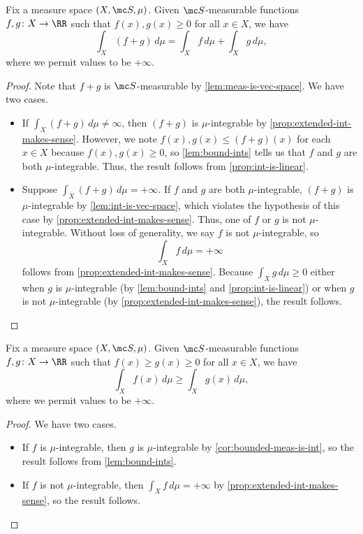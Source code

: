 \documentclass[../notes.tex]{subfiles}
\begin{document}
\begin{lemma} \label{lem:add-extended-int}
	Fix a measure space $(X,\mc S,\mu)$. Given $\mc S$-measurable functions $f,g\colon X\to\RR$ such that $f(x),g(x)\ge0$ for all $x\in X$, we have
	\[\int_X(f+g)\,d\mu=\int_Xf\,d\mu+\int_Xg\,d\mu,\]
	where we permit values to be $+\infty$.
\end{lemma}
\begin{proof}
	Note that $f+g$ is $\mc S$-measurable by \autoref{lem:meas-is-vec-space}. We have two cases.
	\begin{itemize}
		\item If $\int_X(f+g)\,d\mu\ne\infty$, then $(f+g)$ is $\mu$-integrable by \autoref{prop:extended-int-makes-sense}. However, we note $f(x),g(x)\le(f+g)(x)$ for each $x\in X$ because $f(x),g(x)\ge0$, so \autoref{lem:bound-ints} tells us that $f$ and $g$ are both $\mu$-integrable. Thus, the result follows from \autoref{prop:int-is-linear}.
		\item Suppose $\int_X(f+g)\,d\mu=+\infty$. If $f$ and $g$ are both $\mu$-integrable, $(f+g)$ is $\mu$-integrable by \autoref{lem:int-is-vec-space}, which violates the hypothesis of this case by \autoref{prop:extended-int-makes-sense}. Thus, one of $f$ or $g$ is not $\mu$-integrable. Without loss of generality, we say $f$ is not $\mu$-integrable, so
		\[\int_Xf\,d\mu=+\infty\]
		follows from \autoref{prop:extended-int-makes-sense}. Because $\int_Xg\,d\mu\ge0$ either when $g$ is $\mu$-integrable (by \autoref{lem:bound-ints} and \autoref{prop:int-is-linear}) or when $g$ is not $\mu$-integrable (by \autoref{prop:extended-int-makes-sense}), the result follows.
		\qedhere
	\end{itemize}
\end{proof}
\begin{lemma} \label{lem:bound-extended-int}
	Fix a measure space $(X,\mc S,\mu)$. Given $\mc S$-measurable functions $f,g\colon X\to\RR$ such that $f(x)\ge g(x)\ge0$ for all $x\in X$, we have
	\[\int_Xf(x)\,d\mu\ge\int_Xg(x)\,d\mu,\]
	where we permit values to be $+\infty$.
\end{lemma}
\begin{proof}
	We have two cases.
	\begin{itemize}
		\item If $f$ is $\mu$-integrable, then $g$ is $\mu$-integrable by \autoref{cor:bounded-meas-is-int}, so the result follows from \autoref{lem:bound-ints}.
		\item If $f$ is not $\mu$-integrable, then $\int_Xf\,d\mu=+\infty$ by \autoref{prop:extended-int-makes-sense}, so the result follows.
		\qedhere
	\end{itemize}
\end{proof}
\end{document}
